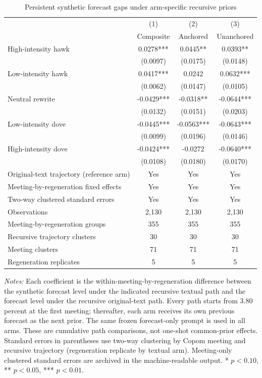 \begin{table}[htbp]
\color{revisionred}
\centering
\begin{threeparttable}
\caption{Persistent synthetic forecast gaps under arm-specific recursive priors}
\label{tab:arm-specific-prior-dose-arms}
\begin{footnotesize}
\begin{tabular}{lccc}
\toprule
 & (1) & (2) & (3) \\
 & Composite & Anchored & Unanchored \\
\midrule
High-intensity hawk & 0.0278*** & 0.0445** & 0.0393** \\
 & (0.0097) & (0.0175) & (0.0148) \\
Low-intensity hawk & 0.0417*** & 0.0242 & 0.0632*** \\
 & (0.0062) & (0.0147) & (0.0105) \\
Neutral rewrite & -0.0429*** & -0.0318** & -0.0644*** \\
 & (0.0132) & (0.0151) & (0.0203) \\
Low-intensity dove & -0.0445*** & -0.0563*** & -0.0643*** \\
 & (0.0099) & (0.0196) & (0.0146) \\
High-intensity dove & -0.0424*** & -0.0272 & -0.0640*** \\
 & (0.0108) & (0.0180) & (0.0170) \\
\midrule
Original-text trajectory (reference arm) & Yes & Yes & Yes \\
Meeting-by-regeneration fixed effects & Yes & Yes & Yes \\
Two-way clustered standard errors & Yes & Yes & Yes \\
Observations & 2,130 & 2,130 & 2,130 \\
Meeting-by-regeneration groups & 355 & 355 & 355 \\
Recursive trajectory clusters & 30 & 30 & 30 \\
Meeting clusters & 71 & 71 & 71 \\
Regeneration replicates & 5 & 5 & 5 \\
\bottomrule
\end{tabular}
\begin{tablenotes}[flushleft]
\scriptsize
\item \textit{Notes:} Each coefficient is the within-meeting-by-regeneration difference between the synthetic forecast level under the indicated recursive textual path and the forecast level under the recursive original-text path. Every path starts from 3.80 percent at the first meeting; thereafter, each arm receives its own previous forecast as the next prior. The same frozen forecast-only prompt is used in all arms. These are cumulative path comparisons, not one-shot common-prior effects. Standard errors in parentheses use two-way clustering by Copom meeting and recursive trajectory (regeneration replicate by textual arm). Meeting-only clustered standard errors are archived in the machine-readable output. * $p<0.10$, ** $p<0.05$, *** $p<0.01$.
\end{tablenotes}
\end{footnotesize}
\end{threeparttable}
\end{table}
